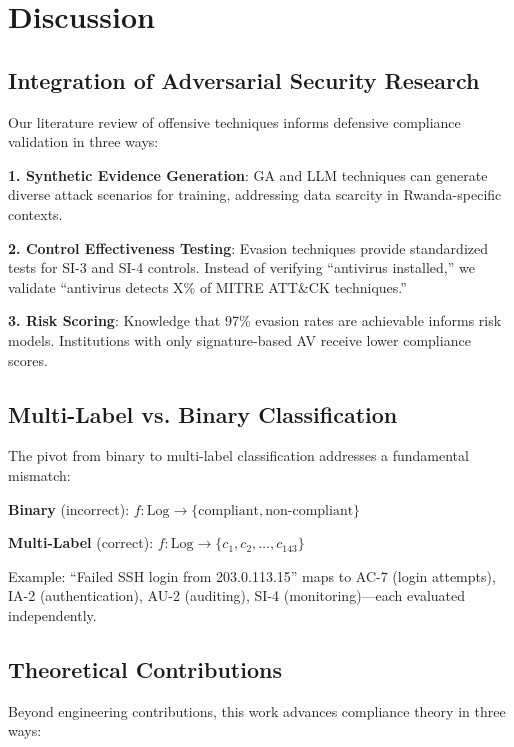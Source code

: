 \documentclass[11pt,conference]{IEEEtran}
\begin{document}
\section{Discussion}

\subsection{Integration of Adversarial Security Research}

Our literature review of offensive techniques informs defensive compliance validation in three ways:

\textbf{1. Synthetic Evidence Generation}: GA and LLM techniques can generate diverse attack scenarios for training, addressing data scarcity in Rwanda-specific contexts.

\textbf{2. Control Effectiveness Testing}: Evasion techniques provide standardized tests for SI-3 and SI-4 controls. Instead of verifying ``antivirus installed,'' we validate ``antivirus detects X\% of MITRE ATT\&CK techniques.''

\textbf{3. Risk Scoring}: Knowledge that 97\% evasion rates are achievable \cite{reverse_shell_paper} informs risk models. Institutions with only signature-based AV receive lower compliance scores.

\subsection{Multi-Label vs. Binary Classification}

The pivot from binary to multi-label classification addresses a fundamental mismatch:

\textbf{Binary} (incorrect): $f: \text{Log} \rightarrow \{\text{compliant}, \text{non-compliant}\}$

\textbf{Multi-Label} (correct): $f: \text{Log} \rightarrow \{c_1, c_2, \ldots, c_{143}\}$

Example: ``Failed SSH login from 203.0.113.15'' maps to AC-7 (login attempts), IA-2 (authentication), AU-2 (auditing), SI-4 (monitoring)---each evaluated independently.

\subsection{Theoretical Contributions}

Beyond engineering contributions, this work advances compliance theory in three ways:
\end{document}
